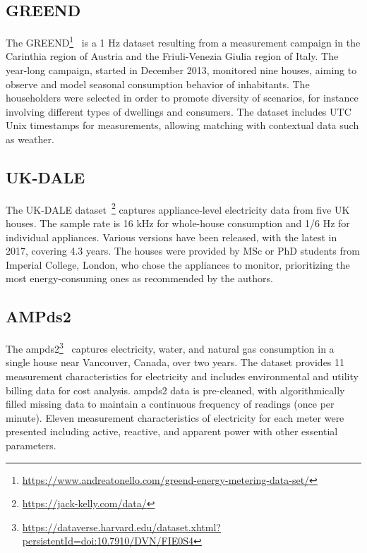 \subsection{GREEND}

The GREEND\footnote{\url{https://www.andreatonello.com/greend-energy-metering-data-set/}}~\parencite{monacchi_greend_2014} is a 1 Hz dataset resulting from a measurement campaign in the Carinthia region of Austria and the Friuli-Venezia Giulia region of Italy. The year-long campaign, started in December 2013, monitored nine houses, aiming to observe and model seasonal consumption behavior of inhabitants. The householders were selected in order to promote diversity of scenarios, for instance involving different types of dwellings and consumers. The dataset includes UTC Unix timestamps for measurements, allowing matching with contextual data such as weather.

\subsection{UK-DALE}

The UK-DALE dataset~\parencite{kelly_uk-dale_2015}\footnote{\url{https://jack-kelly.com/data/}} captures appliance-level electricity data from five UK houses. The sample rate is 16 kHz for whole-house consumption and 1/6 Hz for individual appliances. Various versions have been released, with the latest in 2017, covering 4.3 years. The houses were provided by MSc or PhD students from Imperial College, London, who chose the appliances to monitor, prioritizing the most energy-consuming ones as recommended by the authors.


\subsection{AMPds2}

The \acrlong{ampds2}\footnote{\url{https://dataverse.harvard.edu/dataset.xhtml?persistentId=doi:10.7910/DVN/FIE0S4}}~\parencite{makonin_electricity_2016} captures electricity, water, and natural gas consumption in a single house near Vancouver, Canada, over two years. The dataset provides 11 measurement characteristics for electricity and includes environmental and utility billing data for cost analysis. \acrshort{ampds2} data is pre-cleaned, with algorithmically filled missing data to maintain a continuous frequency of readings (once per minute). Eleven measurement characteristics of electricity for each meter were presented including active, reactive, and apparent power with other essential parameters.

